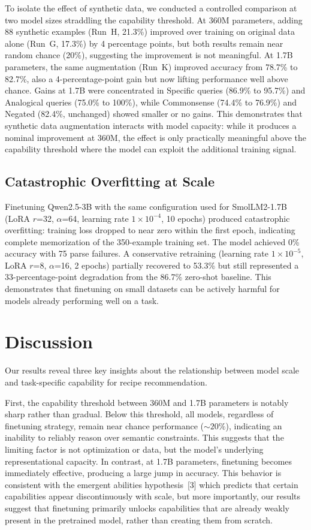 \documentclass{article}
\begin{document}
To isolate the effect of synthetic data, we conducted a controlled comparison at two model sizes straddling the capability threshold. At 360M parameters, adding 88 synthetic examples (Run~H, 21.3\%) improved over training on original data alone (Run~G, 17.3\%) by 4 percentage points, but both results remain near random chance (20\%), suggesting the improvement is not meaningful. At 1.7B parameters, the same augmentation (Run~K) improved accuracy from 78.7\% to 82.7\%, also a 4-percentage-point gain but now lifting performance well above chance. Gains at 1.7B were concentrated in Specific queries (86.9\% to 95.7\%) and Analogical queries (75.0\% to 100\%), while Commonsense (74.4\% to 76.9\%) and Negated (82.4\%, unchanged) showed smaller or no gains. This demonstrates that synthetic data augmentation interacts with model capacity: while it produces a nominal improvement at 360M, the effect is only practically meaningful above the capability threshold where the model can exploit the additional training signal.

\subsection{Catastrophic Overfitting at Scale}

Finetuning Qwen2.5-3B with the same configuration used for SmolLM2-1.7B (LoRA $r$=32, $\alpha$=64, learning rate $1 \times 10^{-4}$, 10 epochs) produced catastrophic overfitting: training loss dropped to near zero within the first epoch, indicating complete memorization of the 350-example training set. The model achieved 0\% accuracy with 75 parse failures. A conservative retraining (learning rate $1 \times 10^{-5}$, LoRA $r$=8, $\alpha$=16, 2 epochs) partially recovered to 53.3\% but still represented a 33-percentage-point degradation from the 86.7\% zero-shot baseline. This demonstrates that finetuning on small datasets can be actively harmful for models already performing well on a task.

\section{Discussion}

Our results reveal three key insights about the relationship between model scale and task-specific capability for recipe recommendation.

First, the capability threshold between 360M and 1.7B parameters is notably sharp rather than gradual. Below this threshold, all models, regardless of finetuning strategy, remain near chance performance (\(\sim 20\%\)), indicating an inability to reliably reason over semantic constraints. This suggests that the limiting factor is not optimization or data, but the model’s underlying representational capacity. In contrast, at 1.7B parameters, finetuning becomes immediately effective, producing a large jump in accuracy. This behavior is consistent with the emergent abilities hypothesis~[3] which predicts that certain capabilities appear discontinuously with scale, but more importantly, our results suggest that finetuning primarily unlocks capabilities that are already weakly present in the pretrained model, rather than creating them from scratch.
\end{document}

